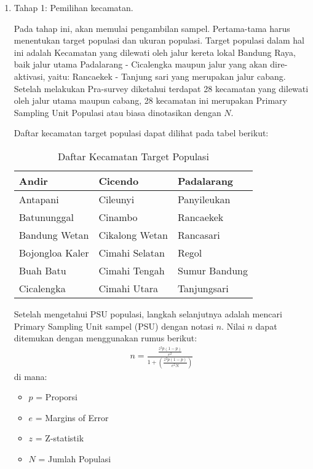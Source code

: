 \documentclass{article}
\begin{document}
\begin{enumerate}
    \item Tahap 1: Pemilihan kecamatan. 
    
    \par\noindent
    Pada tahap ini, akan memulai pengambilan sampel. Pertama-tama harus menentukan target populasi dan ukuran populasi. Target populasi dalam hal ini adalah Kecamatan yang dilewati oleh jalur kereta lokal Bandung Raya, baik jalur utama Padalarang - Cicalengka maupun jalur yang akan dire-aktivasi, yaitu: Rancaekek - Tanjung sari yang merupakan jalur cabang. Setelah melakukan Pra-survey diketahui terdapat 28 kecamatan yang dilewati oleh jalur utama maupun cabang, 28 kecamatan ini merupakan Primary Sampling Unit Populasi atau biasa dinotasikan dengan $N$.

    
    \par\noindent
    Daftar kecamatan target populasi dapat dilihat pada tabel berikut:
    \begin{table}[ht]
        \centering
        \caption{Daftar Kecamatan Target Populasi}
        \label{tabel:psu_populasi}
        \begin{tabular}{|p{3cm}|p{3cm}|p{3cm}|}
        \hline
        Andir & Cicendo & Padalarang \\ \hline
        Antapani & Cileunyi & Panyileukan \\ \hline
        Batununggal & Cinambo & Rancaekek \\ \hline
        Bandung Wetan & Cikalong Wetan & Rancasari \\ \hline
        Bojongloa Kaler & Cimahi Selatan & Regol \\ \hline
        Buah Batu & Cimahi Tengah & Sumur Bandung \\ \hline
        Cicalengka & Cimahi Utara & Tanjungsari \\ \hline
        \end{tabular}
\end{table}

Setelah mengetahui PSU populasi, langkah selanjutnya adalah mencari Primary Sampling Unit sampel (PSU) dengan notasi $n$. Nilai $n$ dapat ditemukan dengan menggunakan rumus berikut:
\begin{align}
    n = \frac{\frac{z^{2}p(1-p)}{e^{2}}}{1 + \left(\frac{z^{2}p(1-p)}{e^{2}N}\right)}
\end{align}
di mana:
\begin{itemize}
    \item $p$ = Proporsi
    \item $e$ = Margins of Error
    \item $z$ = Z-statistik
    \item $N$ = Jumlah Populasi
\end{itemize}


\end{enumerate}
\end{document}
